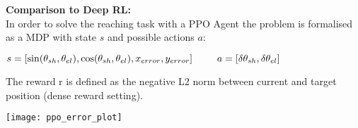 \documentclass[portrait,final,a0paper,fontscale=0.374]{baposter}
\begin{document}
\begin{poster}
{\begin{adjustbox}{minipage=0.95\textwidth, margin=5pt, center}
\begin{minipage}[t]{0.725\textwidth}
			\textbf{Comparison to Deep RL:}\\[2pt]
			In order to solve the reaching task with a PPO Agent \parencite{schulmanProximalPolicyOptimization2017} the problem is formalised as a MDP with state $s$ and possible actions $a$:\\
			\begin{center}
				$s = [\sin(\theta_{sh}, \theta_{el}),  \cos(\theta_{sh}, \theta_{el}), x_{error}, y_{error}] \hspace{25pt} a = [\delta\theta_{sh}, \delta\theta_{el}]\vspace{5pt}$
			\end{center}
			The reward r is defined as the negative L2 norm between current and target position (dense reward setting).
			\begin{center}
				\texttt{[image: ppo\_error\_plot]}
			\end{center}
		\end{minipage}
		\hfill
	\end{adjustbox}

}






\end{poster}
\end{document}
